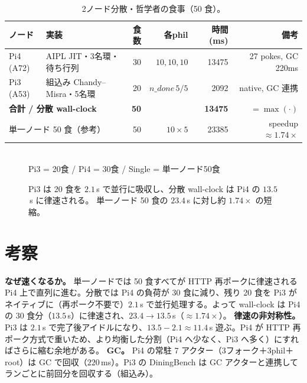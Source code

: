 \documentclass[11pt]{ltjsarticle}
\begin{document}
\begin{table}[h]\centering
\caption{2ノード分散・哲学者の食事（50 食）。}
\label{tab:dd}
\begin{tabular}{l l r r r r}
\toprule
ノード & 実装 & 食数 & 各phil & 時間 (ms) & 備考 \\
\midrule
Pi4 (A72) & AIPL JIT・3名環・待ち行列 & 30 & $10,10,10$ & 13475 & 27 pokes, GC 220ms \\
Pi3 (A53) & 組込み Chandy--Misra・5名環 & 20 & $n\_done\,5/5$ & 2092 & native, GC 連携 \\
\midrule
\multicolumn{2}{l}{\textbf{合計 / 分散 wall-clock}} & \textbf{50} & & \textbf{13475} & $=\max(\cdot)$ \\
\multicolumn{2}{l}{単一ノード 50 食（参考）} & 50 & $10{\times}5$ & 23385 & speedup $\approx 1.74\times$ \\
\bottomrule
\end{tabular}
\end{table}

\begin{figure}[h]\centering
{}\\
\footnotesize Pi3 = 20食 / Pi4 = 30食 / Single = 単一ノード50食
\caption{Pi3 は 20 食を $2.1$\,s で並行に吸収し、分散 wall-clock は Pi4 の $13.5$\,s に律速される。
単一ノード 50 食の $23.4$\,s に対し約 $1.74\times$ の短縮。}
\label{fig:dd}
\end{figure}

\section{考察}
\textbf{なぜ速くなるか。} 単一ノードでは 50 食すべてが HTTP 再ポークに律速される Pi4 上で直列に進む。分散では Pi4 の負荷が
30 食に減り、残り 20 食を Pi3 がネイティブに（再ポーク不要で）$2.1$\,s で並行処理する。よって wall-clock は
Pi4 の 30 食分（$13.5$\,s）に律速され、$23.4 \to 13.5$\,s（$\approx 1.74\times$）。
\textbf{律速の非対称性。} Pi3 は $2.1$\,s で完了後アイドルになり、$13.5-2.1 \approx 11.4$\,s 遊ぶ。Pi4 が
HTTP 再ポーク方式で重いため、より均衡した分割（Pi4 へ少なく、Pi3 へ多く）にすればさらに縮む余地がある。
\textbf{GC。} Pi4 の常駐 7 アクター（3フォーク＋3phil＋root）は GC で回収（$220$\,ms）。Pi3 の DiningBench は
GC アクターと連携してランごとに前回分を回収する（組込み）。
\end{document}
